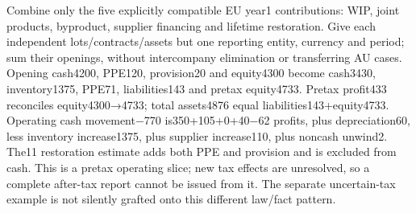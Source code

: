 Combine only the five explicitly compatible EU year1 contributions: WIP, joint products, byproduct, supplier financing and lifetime restoration. Give each independent lots/contracts/assets but one reporting entity, currency and period; sum their openings, without intercompany elimination or transferring AU cases. Opening cash4200, PPE120, provision20 and equity4300 become cash3430, inventory1375, PPE71, liabilities143 and pretax equity4733. Pretax profit433 reconciles equity4300→4733; total assets4876 equal liabilities143+equity4733. Operating cash movement−770 is350+105+0+40−62 profits, plus depreciation60, less inventory increase1375, plus supplier increase110, plus noncash unwind2. The11 restoration estimate adds both PPE and provision and is excluded from cash. This is a pretax operating slice; new tax effects are unresolved, so a complete after-tax report cannot be issued from it. The separate uncertain-tax example is not silently grafted onto this different law/fact pattern.
